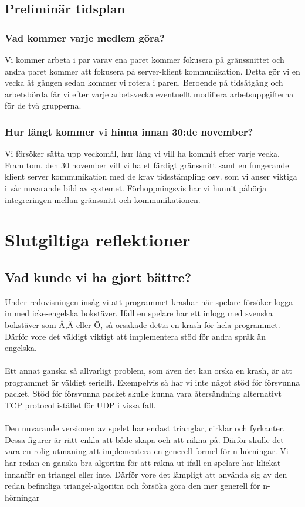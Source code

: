 \documentclass[a4paper]{article}
\begin{document}
\subsection{Preliminär tidsplan}
\subsubsection{Vad kommer varje medlem göra?}
Vi kommer arbeta i par varav ena paret kommer fokusera på gränssnittet och andra paret kommer att fokusera på server-klient kommunikation. Detta gör vi en vecka åt gången sedan kommer vi rotera i paren. Beroende på tidsåtgång och arbetsbörda får vi efter varje arbetsvecka eventuellt modifiera arbetsuppgifterna för de två grupperna.
\subsubsection{Hur långt kommer vi hinna innan 30:de november?}
Vi försöker sätta upp veckomål, hur lång vi vill ha kommit efter varje vecka. Fram tom. den 30 november vill vi ha et färdigt gränssnitt samt en fungerande klient server kommunikation med de krav tidsstämpling osv. som vi anser viktiga i vår nuvarande bild av systemet. Förhoppningsvis har vi hunnit påbörja integreringen mellan gränssnitt och kommunikationen.

\newpage

\section{Slutgiltiga reflektioner}

\subsection{Vad kunde vi ha gjort bättre?}
Under redovisningen insåg vi att programmet krashar när spelare försöker logga in med icke-engelska bokstäver. Ifall en spelare har ett inlogg med svenska bokstäver som Å,Ä eller Ö, så orsakade detta en krash för hela programmet. Därför vore det väldigt viktigt att implementera stöd för andra språk än engelska. \\
\\
Ett annat ganska så allvarligt problem, som även det kan orska en krash, är att programmet är väldigt seriellt. Exempelvis så har vi inte något stöd för försvunna packet. Stöd för försvunna packet skulle kunna vara återsändning alternativt TCP protocol istället för UDP i vissa fall. \\
\\
Den nuvarande versionen av spelet har endast trianglar, cirklar och fyrkanter. Dessa figurer är rätt enkla att både skapa och att räkna på. Därför skulle det vara en rolig utmaning att implementera en generell formel för n-hörningar. Vi har redan en ganska bra algoritm för att räkna ut ifall en spelare har klickat innanför en triangel eller inte. Därför vore det lämpligt att använda sig av den redan befintliga triangel-algoritm och försöka göra den mer generell för n-hörningar\\
\\
\end{document}
